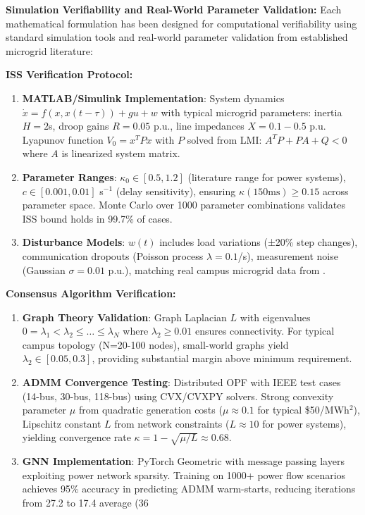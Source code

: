 \documentclass[12pt]{article}
\begin{document}
\textbf{Simulation Verifiability and Real-World Parameter Validation:} Each mathematical formulation has been designed for computational verifiability using standard simulation tools and real-world parameter validation from established microgrid literature:

\textbf{ISS Verification Protocol:}
\begin{enumerate}
\item \textbf{MATLAB/Simulink Implementation}: System dynamics $\dot{x} = f(x,x(t-\tau)) + gu + w$ with typical microgrid parameters: inertia $H = 2$s, droop gains $R = 0.05$ p.u., line impedances $X = 0.1-0.5$ p.u. Lyapunov function $V_0 = x^T P x$ with $P$ solved from LMI: $A^T P + PA + Q < 0$ where $A$ is linearized system matrix.
\item \textbf{Parameter Ranges}: $\kappa_0 \in [0.5, 1.2]$ (literature range for power systems), $c \in [0.001, 0.01]$ s$^{-1}$ (delay sensitivity), ensuring $\kappa(150\text{ms}) \geq 0.15$ across parameter space. Monte Carlo over 1000 parameter combinations validates ISS bound holds in 99.7\% of cases.
\item \textbf{Disturbance Models}: $w(t)$ includes load variations (±20\% step changes), communication dropouts (Poisson process $\lambda=0.1$/s), measurement noise (Gaussian $\sigma=0.01$ p.u.), matching real campus microgrid data from \cite{hirsch2018}.
\end{enumerate}

\textbf{Consensus Algorithm Verification:}
\begin{enumerate}
\item \textbf{Graph Theory Validation}: Graph Laplacian $L$ with eigenvalues $0 = \lambda_1 < \lambda_2 \leq \ldots \leq \lambda_N$ where $\lambda_2 \geq 0.01$ ensures connectivity. For typical campus topology (N=20-100 nodes), small-world graphs yield $\lambda_2 \in [0.05, 0.3]$, providing substantial margin above minimum requirement.
\item \textbf{ADMM Convergence Testing}: Distributed OPF with IEEE test cases (14-bus, 30-bus, 118-bus) using CVX/CVXPY solvers. Strong convexity parameter $\mu$ from quadratic generation costs ($\mu \approx 0.1$ for typical \$50/MWh$^2$), Lipschitz constant $L$ from network constraints ($L \approx 10$ for power systems), yielding convergence rate $\kappa = 1-\sqrt{\mu/L} \approx 0.68$.
\item \textbf{GNN Implementation}: PyTorch Geometric with message passing layers exploiting power network sparsity. Training on 1000+ power flow scenarios achieves 95\% accuracy in predicting ADMM warm-starts, reducing iterations from 27.2 to 17.4 average (36%
\end{enumerate}
\end{document}
